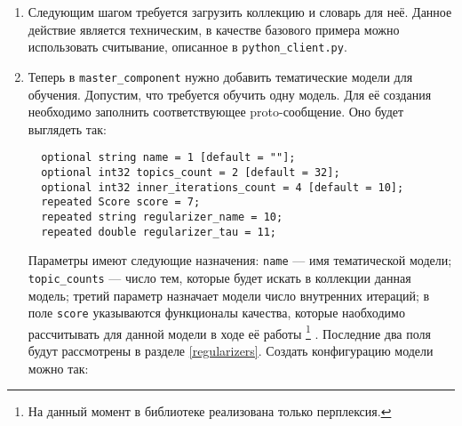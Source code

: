 \begin{enumerate}
	\vspace{5pt}
	
	\verb|  master_config = messages_pb2.MasterComponentConfig()| \\
	\verb|  master_config.processors_count = 1| \\
	\verb|  master_config.disk_path = 'disk_path'|	
	
	\vspace{5pt}
	
	После того, как конфигурационное сообщение сформировано, можно создать сам объект \verb|MasterComponent|:
	
	\vspace{5pt}
	
	\verb|  master_component = library.CreateMasterComponent(master_config)|
	
	\vspace{5pt}
	
	\item Следующим шагом требуется загрузить коллекцию и словарь для неё. Данное действие является техническим, в качестве базового примера можно использовать считывание, описанное в \verb|python_client.py|. 
	
	\item
	\label{step_1}
	 Теперь в \verb|master_component| нужно добавить тематические модели для обучения. Допустим, что требуется обучить одну модель. Для её создания необходимо заполнить соответствующее proto-сообщение. Оно будет выглядеть так:

	\vspace{5pt}

	\verb|  optional string name = 1 [default = ""];| \\
	\verb|  optional int32 topics_count = 2 [default = 32];| \\	
	\verb|  optional int32 inner_iterations_count = 4 [default = 10];| \\
	\verb|  repeated Score score = 7;| \\
    \verb|  repeated string regularizer_name = 10;| \\
    \verb|  repeated double regularizer_tau = 11;|	
	
	\vspace{5pt}
	
	Параметры имеют следующие назначения: 	\verb|name| --- имя тематической модели; \verb|topic_counts| --- число тем, которые будет искать в коллекции данная модель; третий  параметр назначает модели число внутренних итераций; в поле \verb|score| указываются функционалы качества, которые наобходимо рассчитывать для данной модели в ходе её работы
	\footnote{На данный момент в библиотеке реализована только перплексия.}
	. Последние два поля будут рассмотрены в разделе \ref{regularizers}. Создать конфигурацию модели можно так:
	

\end{enumerate}
